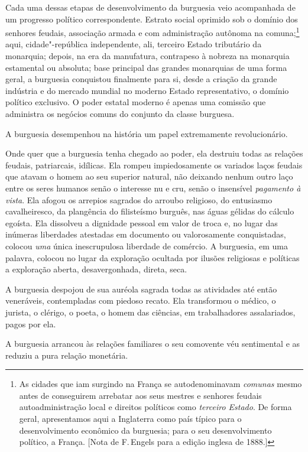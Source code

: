 Cada uma dessas etapas de desenvolvimento da burguesia veio
acompanhada de um progresso político correspondente. Estrato social
oprimido sob o domínio dos senhores feudais, associação armada e com
administração autônoma na comuna;\footnote{ As cidades que iam surgindo na 
França se autodenominavam \textit{comunas} mesmo antes de conseguirem arrebatar aos
seus mestres e senhores feudais autoadministração local e direitos políticos 
como \textit{terceiro Estado}. De forma geral, apresentamos aqui a Inglaterra
como país típico para o desenvolvimento econômico da burguesia; para o seu 
desenvolvimento político, a França. [Nota de F.\,Engels para a edição inglesa 
de 1888.]} aqui, cidade"-república independente, ali, terceiro Estado
tributário da monarquia; depois, na era da manufatura, contrapeso à
nobreza na monarquia estamental ou absoluta; base principal das grandes
monarquias de uma forma geral, a burguesia conquistou finalmente para
si, desde a criação da grande indústria e do mercado mundial no moderno
Estado representativo, o domínio político exclusivo. O poder estatal
moderno é apenas uma comissão que administra os negócios comuns do
conjunto da classe burguesa.

A burguesia desempenhou na história um papel extremamente
revolucionário.

Onde quer que a burguesia tenha chegado ao poder, ela destruiu todas as          \label{3}
relações feudais, patriarcais, idílicas. Ela rompeu impiedosamente os
variados laços feudais que atavam o homem ao seu superior natural, não
deixando nenhum outro laço entre os seres humanos senão o interesse nu
e cru, senão o insensível \textit{pagamento à vista}. Ela afogou os arrepios
sagrados do arroubo religioso, do entusiasmo cavalheiresco, da
plangência do filisteísmo burguês, nas águas gélidas do cálculo
egoísta. Ela dissolveu a dignidade pessoal em valor de troca e, no lugar
das inúmeras liberdades atestadas em documento ou valorosamente
conquistadas, colocou \textit{uma} única inescrupulosa liberdade de
comércio. A burguesia, em uma palavra, colocou no lugar da exploração
ocultada por ilusões religiosas e políticas a exploração aberta,
desavergonhada, direta, seca.

A burguesia despojou de sua auréola sagrada todas as atividades até
então veneráveis, contempladas com piedoso recato. Ela transformou o
médico, o jurista, o clérigo, o poeta, o homem das ciências, em
trabalhadores assalariados, pagos por ela.

A burguesia arrancou às relações familiares o seu comovente véu
sentimental e as reduziu a pura relação monetária.                         

